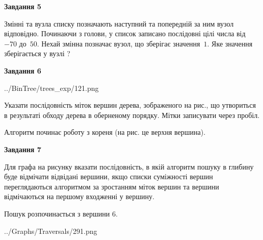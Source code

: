 \documentclass[12pt, ukrainian]{article}
\begin{document}
{\begin {large}
{\begin {center}\textbf{Завдання 5}\end {center}}\par
Змінні  та  вузла списку позначають наступний та попередній за ним вузол відповідно. Починаючи з голови, у список записано послідовні цілі числа від~$-70$ до~$50$. Нехай змінна  позначає вузол, що зберігає значення~$1$.
Яке значення зберігається у вузлі  ?\par
\newpage

{\begin {center}\textbf{Завдання 6}\end {center}}\par

\begin{center}
	{../BinTree/trees_exp/121.png}
\end{center}
Указати послідовність міток вершин дерева, зображеного на рис., що утвориться в результаті обходу дерева в оберненому порядку. Мітки записувати через пробіл.\par Алгоритм починає роботу з кореня (на рис. це верхня вершина).\par
\newpage

{\begin {center}\textbf{Завдання 7}\end {center}}\par
Для графа на рисунку вказати послідовність, в якій алгоритм пошуку в глибину буде відмічати відвідані вершини, якщо списки суміжності вершин переглядаються алгоритмом за зростанням міток вершин та вершини відмічаються на першому вход\-женні у вершину.\par
Пошук розпочинається з вершини 6.\par

\begin{center}
	{../Graphs/Traversals/291.png}
\end{center}\par
\newpage


\end{large}}
\end{document}
